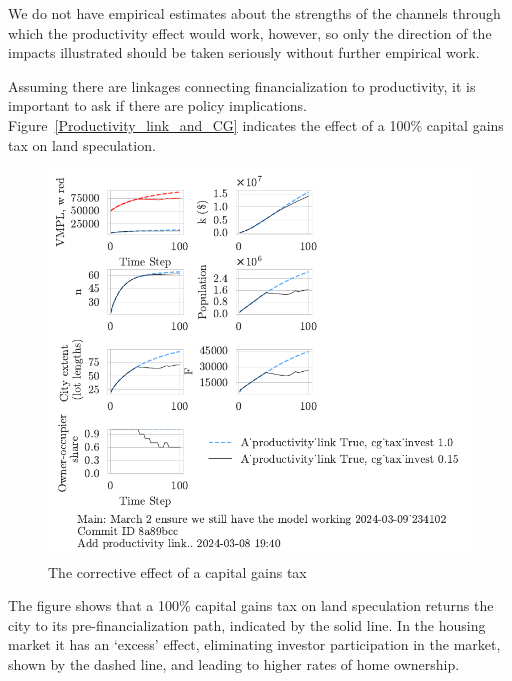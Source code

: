 We do not have empirical estimates about the strengths of the channels through which the productivity effect would work, however, so only the direction of the impacts illustrated should be taken seriously without further empirical work.  


Assuming there are linkages connecting financialization to productivity, it is important to ask if there are policy implications. Figure~\ref{Productivity_link_and_CG} indicates the effect of a 100\% capital gains tax on land speculation. 

\begin{figure}[h!tb]\label{fig-Productivity_link_and_CG}
    \centering
    \includegraphics[scale=1, trim=.25cm 2cm .25cm .25cm, clip]{fig/Productivity_link_and_CG.pdf}
    \caption{The corrective effect of a capital gains tax}
    \label{fig:Productivity_link_and_CG}
\end{figure}

The figure shows that a 100\% capital gains tax on land speculation returns the city to its pre-financialization path, indicated by the solid line. In the housing market it has an `excess' effect, eliminating investor participation in the market, shown by the dashed line, and leading to higher rates of home ownership. 


